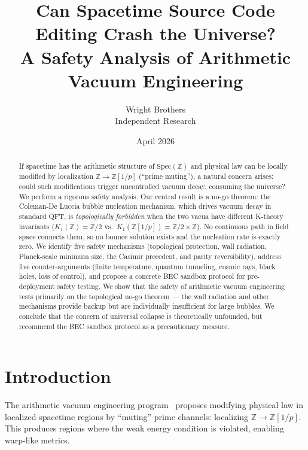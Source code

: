 \documentclass[11pt,a4paper]{article}
\newcommand{\Spec}{\mathrm{Spec}}
\newcommand{\Zp}{\mathbb{Z}[1/p]}
\begin{document}
\title{Can Spacetime Source Code Editing Crash the Universe?\\
  A Safety Analysis of Arithmetic Vacuum Engineering}

\author{Wright Brothers\\{\small Independent Research}}
\date{April 2026}
\maketitle

\begin{abstract}
If spacetime has the arithmetic structure of $\Spec(\mathbb{Z})$
and physical law can be locally modified by localization
$\mathbb{Z} \to \Zp$ (``prime muting''), a natural concern arises:
could such modifications trigger uncontrolled vacuum decay,
consuming the universe? We perform a rigorous safety analysis.
Our central result is a no-go theorem: the Coleman-De Luccia
bubble nucleation mechanism, which drives vacuum decay in standard
QFT, is \emph{topologically forbidden} when the two vacua have
different K-theory invariants ($K_1(\mathbb{Z}) = \mathbb{Z}/2$
vs.\ $K_1(\Zp) = \mathbb{Z}/2 \times \mathbb{Z}$). No continuous
path in field space connects them, so no bounce solution exists and
the nucleation rate is exactly zero. We identify five safety
mechanisms (topological protection, wall radiation, Planck-scale
minimum size, the Casimir precedent, and parity reversibility),
address five counter-arguments (finite temperature, quantum
tunneling, cosmic rays, black holes, loss of control), and
propose a concrete BEC sandbox protocol for pre-deployment
safety testing. We show that the safety of arithmetic vacuum
engineering rests primarily on the topological no-go theorem ---
the wall radiation and other mechanisms provide backup but are
individually insufficient for large bubbles. We conclude that
the concern of universal collapse is theoretically unfounded, but
recommend the BEC sandbox protocol as a precautionary measure.
\end{abstract}

\section{Introduction}

The arithmetic vacuum engineering program~\cite{paper_A,paper_I}
proposes modifying physical law in localized spacetime regions
by ``muting'' prime channels: localizing
$\mathbb{Z} \to \Zp$. This produces regions where the weak
energy condition is violated, enabling warp-like metrics.
\end{document}
